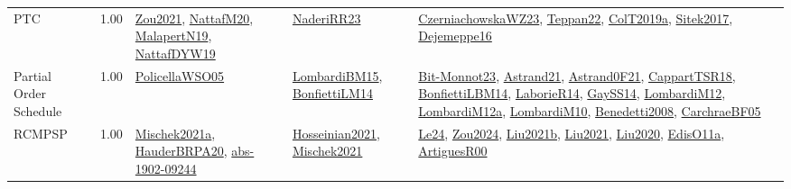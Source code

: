 {\begin{longtable}{p{3cm}r>{\raggedright\arraybackslash}p{6cm}>{\raggedright\arraybackslash}p{6cm}>{\raggedright\arraybackslash}p{8cm}}
\index{PTC}\index{Classification!PTC}PTC &  1.00 & \hyperref[detail:Zou2021]{Zou2021}, \hyperref[detail:NattafM20]{NattafM20}, \hyperref[detail:MalapertN19]{MalapertN19}, \hyperref[detail:NattafDYW19]{NattafDYW19} & \hyperref[detail:NaderiRR23]{NaderiRR23} & \hyperref[detail:CzerniachowskaWZ23]{CzerniachowskaWZ23}, \hyperref[detail:Teppan22]{Teppan22}, \hyperref[detail:ColT2019a]{ColT2019a}, \hyperref[detail:Sitek2017]{Sitek2017}, \hyperref[detail:Dejemeppe16]{Dejemeppe16}\\
\index{Partial Order Schedule}\index{Classification!Partial Order Schedule}Partial Order Schedule &  1.00 & \hyperref[detail:PolicellaWSO05]{PolicellaWSO05} & \hyperref[detail:LombardiBM15]{LombardiBM15}, \hyperref[detail:BonfiettiLM14]{BonfiettiLM14} & \hyperref[detail:Bit-Monnot23]{Bit-Monnot23}, \hyperref[detail:Astrand21]{Astrand21}, \hyperref[detail:Astrand0F21]{Astrand0F21}, \hyperref[detail:CappartTSR18]{CappartTSR18}, \hyperref[detail:BonfiettiLBM14]{BonfiettiLBM14}, \hyperref[detail:LaborieR14]{LaborieR14}, \hyperref[detail:GaySS14]{GaySS14}, \hyperref[detail:LombardiM12]{LombardiM12}, \hyperref[detail:LombardiM12a]{LombardiM12a}, \hyperref[detail:LombardiM10]{LombardiM10}, \hyperref[detail:Benedetti2008]{Benedetti2008}, \hyperref[detail:CarchraeBF05]{CarchraeBF05}\\
\index{RCMPSP}\index{Classification!RCMPSP}RCMPSP &  1.00 & \hyperref[detail:Mischek2021a]{Mischek2021a}, \hyperref[detail:HauderBRPA20]{HauderBRPA20}, \hyperref[detail:abs-1902-09244]{abs-1902-09244} & \hyperref[detail:Hosseinian2021]{Hosseinian2021}, \hyperref[detail:Mischek2021]{Mischek2021} & \hyperref[detail:Le24]{Le24}, \hyperref[detail:Zou2024]{Zou2024}, \hyperref[detail:Liu2021b]{Liu2021b}, \hyperref[detail:Liu2021]{Liu2021}, \hyperref[detail:Liu2020]{Liu2020}, \hyperref[detail:EdisO11a]{EdisO11a}, \hyperref[detail:ArtiguesR00]{ArtiguesR00}\\

\end{longtable}}
